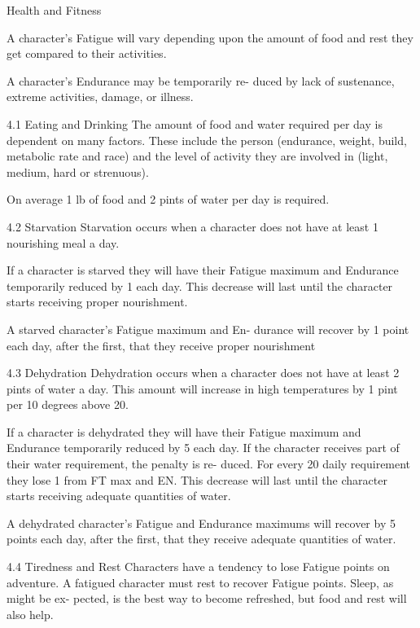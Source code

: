 \begin{Chapter}{Health and Fitness}

A character’s Fatigue will vary depending upon the 
amount of food and rest they get compared to their 
activities. 

A  character’s  Endurance  may  be  temporarily  re-
duced  by  lack  of  sustenance,  extreme  activities, 
damage, or illness. 

4.1 Eating and Drinking 
The  amount  of  food  and  water  required  per  day  is 
dependent  on  many  factors.  These  include  the 
person  (endurance,  weight,  build,  metabolic  rate 
and race) and the level of activity they are involved 
in (light, medium, hard or strenuous). 

On  average  1  lb  of  food  and  2  pints  of  water  per 
day is required. 

4.2 Starvation 
Starvation  occurs  when  a  character  does  not  have 
at least 1 nourishing meal a day. 

If a character is starved they will have their Fatigue 
maximum and Endurance temporarily reduced by 1 
each day. This decrease will last until the character 
starts receiving proper nourishment. 

A  starved  character’s  Fatigue  maximum  and  En-
durance will recover by 1 point each day, after the 
first, that they receive proper nourishment 

4.3 Dehydration 
Dehydration occurs when a character does not have 
at  least  2  pints  of  water  a  day.  This  amount  will 
increase  in  high  temperatures  by  1  pint  per  10 
degrees above 20. 

If  a  character  is  dehydrated  they  will  have  their 
Fatigue  maximum  and  Endurance  temporarily 
reduced  by  5  each  day.  If  the  character  receives 
part  of  their  water  requirement,  the  penalty  is  re-
duced.  For  every  20%
daily  requirement  they  lose  1  from  FT  max  and 
EN. This decrease will last until the character starts 
receiving adequate quantities of water. 

A  dehydrated  character’s  Fatigue  and  Endurance 
maximums will recover by 5 points each day, after 
the  first,  that  they  receive  adequate  quantities  of 
water. 

4.4 Tiredness and Rest 
Characters  have  a  tendency  to  lose  Fatigue  points 
on  adventure.  A  fatigued  character  must  rest  to 
recover  Fatigue  points.  Sleep,  as  might  be  ex-
pected,  is  the  best  way  to  become  refreshed,  but 
food and rest will also help. 


\end{Chapter}

